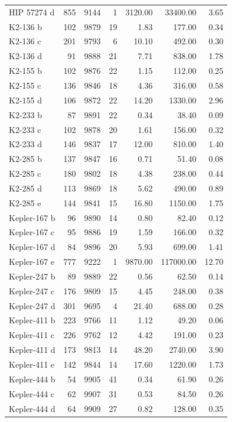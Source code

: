 \begin{table}
\begin{tabular}{lrrrrrr}
HIP 57274 d & 855 & 9144 & 1 & 3120.00 & 33400.00 & 3.65 \\
K2-136 b & 102 & 9879 & 19 & 1.83 & 177.00 & 0.34 \\
K2-136 c & 201 & 9793 & 6 & 10.10 & 492.00 & 0.30 \\
K2-136 d & 91 & 9888 & 21 & 7.71 & 838.00 & 1.78 \\
K2-155 b & 102 & 9876 & 22 & 1.15 & 112.00 & 0.25 \\
K2-155 c & 136 & 9846 & 18 & 4.36 & 316.00 & 0.58 \\
K2-155 d & 106 & 9872 & 22 & 14.20 & 1330.00 & 2.96 \\
K2-233 b & 87 & 9891 & 22 & 0.34 & 38.40 & 0.09 \\
K2-233 c & 102 & 9878 & 20 & 1.61 & 156.00 & 0.32 \\
K2-233 d & 146 & 9837 & 17 & 12.00 & 810.00 & 1.40 \\
K2-285 b & 137 & 9847 & 16 & 0.71 & 51.40 & 0.08 \\
K2-285 c & 180 & 9802 & 18 & 4.38 & 238.00 & 0.44 \\
K2-285 d & 113 & 9869 & 18 & 5.62 & 490.00 & 0.89 \\
K2-285 e & 144 & 9841 & 15 & 16.80 & 1150.00 & 1.75 \\
Kepler-167 b & 96 & 9890 & 14 & 0.80 & 82.40 & 0.12 \\
Kepler-167 c & 95 & 9886 & 19 & 1.59 & 166.00 & 0.32 \\
Kepler-167 d & 84 & 9896 & 20 & 5.93 & 699.00 & 1.41 \\
Kepler-167 e & 777 & 9222 & 1 & 9870.00 & 117000.00 & 12.70 \\
Kepler-247 b & 89 & 9889 & 22 & 0.56 & 62.50 & 0.14 \\
Kepler-247 c & 176 & 9809 & 15 & 4.45 & 248.00 & 0.38 \\
Kepler-247 d & 301 & 9695 & 4 & 21.40 & 688.00 & 0.28 \\
Kepler-411 b & 223 & 9766 & 11 & 1.12 & 49.20 & 0.06 \\
Kepler-411 c & 226 & 9762 & 12 & 4.42 & 191.00 & 0.23 \\
Kepler-411 d & 173 & 9813 & 14 & 48.20 & 2740.00 & 3.90 \\
Kepler-411 e & 142 & 9844 & 14 & 17.60 & 1220.00 & 1.73 \\
Kepler-444 b & 54 & 9905 & 41 & 0.34 & 61.90 & 0.26 \\
Kepler-444 c & 62 & 9907 & 31 & 0.53 & 84.50 & 0.26 \\
Kepler-444 d & 64 & 9909 & 27 & 0.82 & 128.00 & 0.35 \\

\end{tabular}
\end{table}
